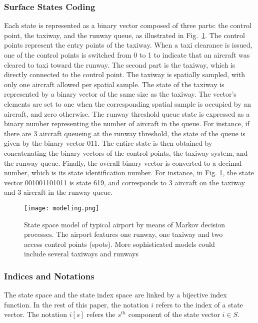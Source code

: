 \documentclass[letterpaper]{article}
\begin{document}
\subsubsection{Surface States Coding}
Each state is represented as a binary vector composed of three parts: the control point, the taxiway, and the runway queue, as illustrated 
in Fig.~\ref{modeling}. The control points represent the entry points of the taxiway. When a taxi clearance is issued, 
one of the control points is switched from 0 to 1 to indicate that an aircraft was cleared to taxi toward the runway. 
The second part is the taxiway, which is directly connected to the control point. The taxiway is spatially sampled, 
with only one aircraft allowed per spatial sample. The state of the taxiway is represented by a binary vector of the same size as the taxiway. The vector's elements are set to one when the corresponding spatial sample is occupied by an aircraft, and zero otherwise. 
The runway threshold queue state
is expressed as a binary number representing the number of aircraft in the queue. For instance, if there are 3 aircraft queueing at the runway threshold, the state of the queue is given by the binary vector 011.
The entire state is then obtained by concatenating the binary vectors of the control points, the taxiway system, and the runway queue.
Finally, the overall binary vector is converted to a decimal number, 
which is its state identification number. For instance, in Fig. \ref{modeling}, the state vector 001001101011 is state 619, 
and corresponds to 3 aircraft on the taxiway and 3 aircraft in the runway queue.\\
\begin{figure}[ht]
\centering
\texttt{[image: modeling.png]}
\caption{State space model of typical airport by means of Markov decision processes. The airport features one runway, one taxiway and two access control points (spots). 
More sophisticated models could include several taxiways and runways} \label{modeling}
\end{figure}

\subsubsection{Indices and Notations}

The state space and the state index space are linked by a bijective index function.
In the rest of this paper, the notation $i$ refers to the index of a state vector.
The notation $i[s]$ refers the $s^{th}$ component of the state vector $i \in S$.
\end{document}
